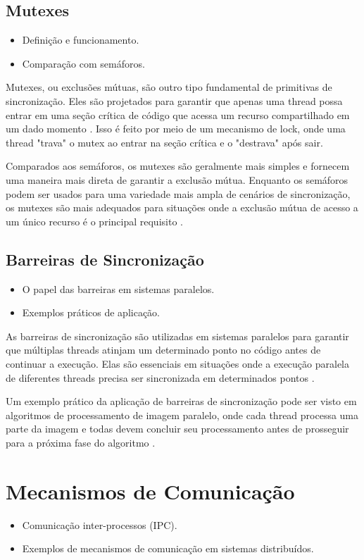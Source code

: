 \documentclass[conference]{IEEEtran}
\begin{document}
\subsection{Mutexes}
\begin{itemize}
    \item Definição e funcionamento.
    \item Comparação com semáforos.
\end{itemize}
Mutexes, ou exclusões mútuas, são outro tipo fundamental de primitivas de sincronização. 
Eles são projetados para garantir que apenas uma thread possa entrar em uma 
seção crítica de código que acessa um recurso compartilhado em um dado momento \cite{silberschatz2009operating}. 
Isso é feito por meio de um mecanismo de lock, 
onde uma thread "trava" o mutex ao entrar na seção crítica e o "destrava" após sair.

Comparados aos semáforos, os mutexes são geralmente mais simples e 
fornecem uma maneira mais direta de garantir a exclusão mútua. 
Enquanto os semáforos podem ser usados para uma variedade mais ampla 
de cenários de sincronização, os mutexes são mais adequados 
para situações onde a exclusão mútua de acesso a um 
único recurso é o principal requisito \cite{herlihy2011art}.

\subsection{Barreiras de Sincronização}
\begin{itemize}
    \item O papel das barreiras em sistemas paralelos.
    \item Exemplos práticos de aplicação.
\end{itemize}

As barreiras de sincronização são utilizadas em sistemas paralelos 
para garantir que múltiplas threads atinjam um determinado ponto no código 
antes de continuar a execução. Elas são essenciais em situações onde 
a execução paralela de diferentes threads precisa 
ser sincronizada em determinados pontos \cite{grama2003introduction}.

Um exemplo prático da aplicação de barreiras de sincronização pode ser visto 
em algoritmos de processamento de imagem paralelo, 
onde cada thread processa uma parte da imagem e todas devem concluir 
seu processamento antes de prosseguir 
para a próxima fase do algoritmo \cite{mccool2012structured}.

\section{Mecanismos de Comunicação}
\begin{itemize}
    \item Comunicação inter-processos (IPC).
    \item Exemplos de mecanismos de comunicação em sistemas distribuídos.
\end{itemize}
\end{document}
